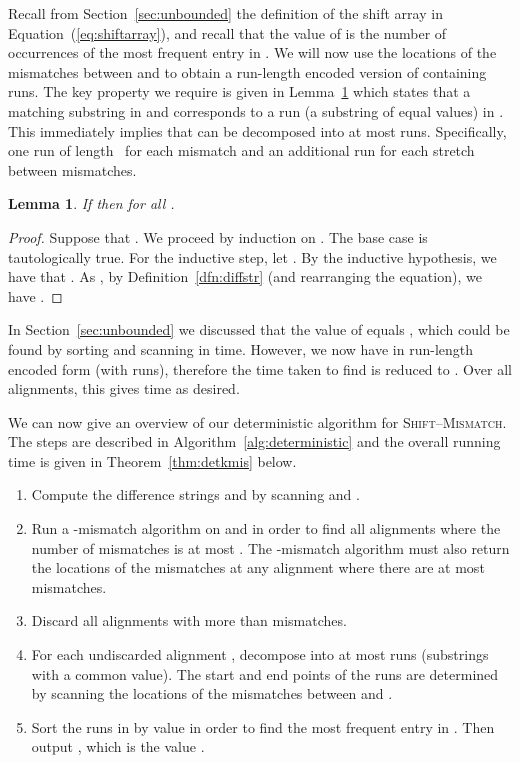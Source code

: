 \documentclass[11pt]{article}
\newcommand{\skMismatch}{\textsc{Shift--Mismatch}\xspace}
\theoremstyle{plain}
\newtheorem{lemma}[theorem]{Lemma}
\theoremstyle{definition}
\begin{document}
Recall from Section~\ref{sec:unbounded} the definition of the shift array  in Equation~(\ref{eq:shiftarray}), and recall that the value of  is the number of occurrences of the most frequent entry in . We will now use the locations of the mismatches between  and  to obtain a run-length encoded version of  containing  runs. The key property we require is given in Lemma~\ref{lem:run} which states that a matching substring in  and  corresponds to a run (a substring of equal values) in . This immediately implies that  can be decomposed into at most  runs. Specifically, one run of length~ for each mismatch and an additional run for each stretch between mismatches.

\begin{lemma}
    \label{lem:run}
    If  then  for all .
\end{lemma}
\begin{proof}
    Suppose that . We proceed by induction on . The base case  is tautologically true. For the inductive step, let . By the inductive hypothesis, we have that . As , by Definition~\ref{dfn:diffstr} (and rearranging the equation), we have .
\end{proof}

In Section~\ref{sec:unbounded} we discussed that the value of  equals , which could be found by sorting and scanning  in  time. However, we now have  in run-length encoded form (with  runs), therefore the time taken to find  is reduced to . Over all alignments, this gives  time as desired.

We can now give an overview of our deterministic algorithm for \skMismatch. The steps are described in Algorithm~\ref{alg:deterministic} and the overall running time is given in Theorem~\ref{thm:detkmis} below.

\begin{algorithm}[t]
    \caption{Overview of deterministic solution to \skMismatch.
        \label{alg:deterministic}}
    \begin{enumerate}
        \item Compute the difference strings  and  by scanning  and .
        \item Run a -mismatch algorithm on  and  in order to find all alignments where the number of mismatches is at most . The -mismatch algorithm must also return the locations of the mismatches at any alignment where there are at most  mismatches.
        \item Discard all alignments with more than  mismatches.
        \item For each undiscarded alignment , decompose  into at most  runs (substrings with a common value). The start and end points of the runs are determined by scanning the locations of the  mismatches between  and .
        \item Sort the runs in  by value in order to find the most frequent entry  in . Then output , which is the value .
    \end{enumerate}
    \vspace{-8pt}
\end{algorithm}
\end{document}
